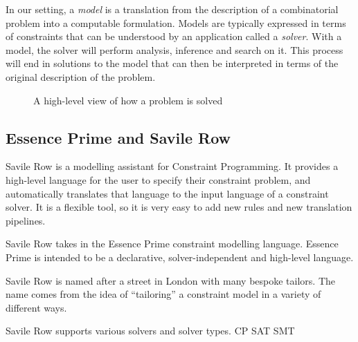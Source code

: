 In our setting, a \emph{model} is a translation from the description of a
combinatorial problem into a computable formulation. Models are typically
expressed in terms of constraints that can be understood by an application
called a \emph{solver}. With a model, the solver will perform analysis, 
inference and search on it. This process will end in solutions to the model that
can then be interpreted in terms of the original description of the problem. 

\begin{figure}
    \centering
    
    \label{fig-modelling}
    \caption{A high-level view of how a problem is solved}
\end{figure}

\subsection{Essence Prime and Savile Row}

Savile Row is a modelling assistant for Constraint Programming. It provides a
high-level language for the user to specify their constraint problem, and
automatically translates that language to the input language of a constraint
solver. It is a flexible tool, so it is very easy to add new rules and new
translation pipelines.

Savile Row takes in the Essence Prime constraint modelling language. Essence
Prime is intended to be a declarative, solver-independent and high-level language. 

Savile Row is named after a street in London with many bespoke tailors. The
name comes from the idea of ``tailoring'' a constraint model in a variety of
different ways.

Savile Row supports various solvers and solver types.
CP
SAT
SMT

